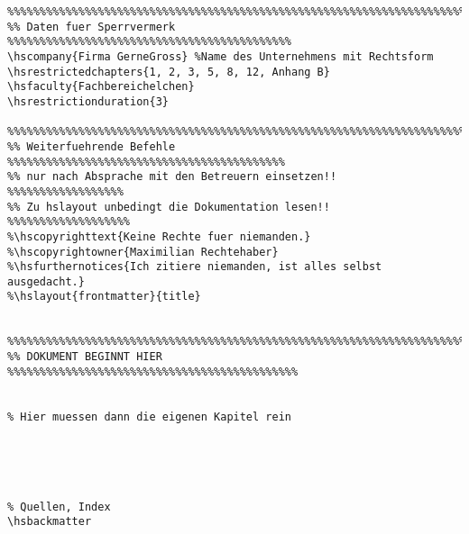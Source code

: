\begin{verbatim}
%%%%%%%%%%%%%%%%%%%%%%%%%%%%%%%%%%%%%%%%%%%%%%%%%%%%%%%%%%%%%%%%%%%%%%%
%% Daten fuer Sperrvermerk  %%%%%%%%%%%%%%%%%%%%%%%%%%%%%%%%%%%%%%%%%%%%
\hscompany{Firma GerneGross} %Name des Unternehmens mit Rechtsform
\hsrestrictedchapters{1, 2, 3, 5, 8, 12, Anhang B}
\hsfaculty{Fachbereichelchen}
\hsrestrictionduration{3}

%%%%%%%%%%%%%%%%%%%%%%%%%%%%%%%%%%%%%%%%%%%%%%%%%%%%%%%%%%%%%%%%%%%%%%%
%% Weiterfuehrende Befehle  %%%%%%%%%%%%%%%%%%%%%%%%%%%%%%%%%%%%%%%%%%%
%% nur nach Absprache mit den Betreuern einsetzen!!  %%%%%%%%%%%%%%%%%%
%% Zu hslayout unbedingt die Dokumentation lesen!!  %%%%%%%%%%%%%%%%%%%
%\hscopyrighttext{Keine Rechte fuer niemanden.}
%\hscopyrightowner{Maximilian Rechtehaber}
%\hsfurthernotices{Ich zitiere niemanden, ist alles selbst ausgedacht.}
%\hslayout{frontmatter}{title}


%%%%%%%%%%%%%%%%%%%%%%%%%%%%%%%%%%%%%%%%%%%%%%%%%%%%%%%%%%%%%%%%%%%%%%%
%% DOKUMENT BEGINNT HIER  %%%%%%%%%%%%%%%%%%%%%%%%%%%%%%%%%%%%%%%%%%%%%


% Hier muessen dann die eigenen Kapitel rein





% Quellen, Index
\hsbackmatter



\end{verbatim}
